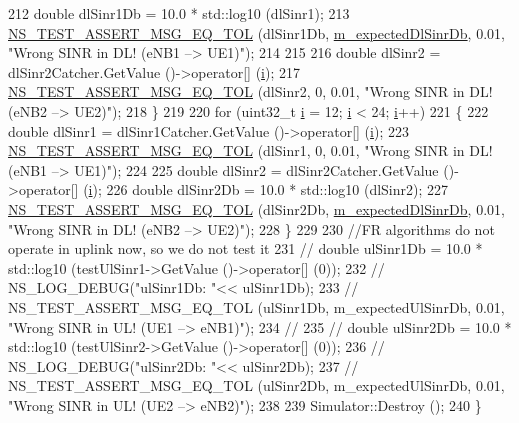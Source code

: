 \begin{DoxyCode}
212       \textcolor{keywordtype}{double} dlSinr1Db = 10.0 * std::log10 (dlSinr1);
213       \hyperlink{group__testing_ga9e7861b56b4e70db3b56044cb7a28e41}{NS\_TEST\_ASSERT\_MSG\_EQ\_TOL} (dlSinr1Db, 
      \hyperlink{classLteInterferenceHardFrTestCase_a4e66afcba8495ddb2ae4696dd905e25d}{m\_expectedDlSinrDb}, 0.01, \textcolor{stringliteral}{"Wrong SINR in DL! (eNB1 --> UE1)"});
214 
215 
216       \textcolor{keywordtype}{double} dlSinr2 = dlSinr2Catcher.GetValue ()->operator[] (\hyperlink{bernuolliDistribution_8m_a6f6ccfcf58b31cb6412107d9d5281426}{i});
217       \hyperlink{group__testing_ga9e7861b56b4e70db3b56044cb7a28e41}{NS\_TEST\_ASSERT\_MSG\_EQ\_TOL} (dlSinr2, 0, 0.01, \textcolor{stringliteral}{"Wrong SINR in DL! (eNB2 -->
       UE2)"});
218     \}
219 
220   \textcolor{keywordflow}{for} (uint32\_t \hyperlink{bernuolliDistribution_8m_a6f6ccfcf58b31cb6412107d9d5281426}{i} = 12; \hyperlink{bernuolliDistribution_8m_a6f6ccfcf58b31cb6412107d9d5281426}{i} < 24; \hyperlink{bernuolliDistribution_8m_a6f6ccfcf58b31cb6412107d9d5281426}{i}++)
221     \{
222       \textcolor{keywordtype}{double} dlSinr1 = dlSinr1Catcher.GetValue ()->operator[] (\hyperlink{bernuolliDistribution_8m_a6f6ccfcf58b31cb6412107d9d5281426}{i});
223       \hyperlink{group__testing_ga9e7861b56b4e70db3b56044cb7a28e41}{NS\_TEST\_ASSERT\_MSG\_EQ\_TOL} (dlSinr1, 0, 0.01, \textcolor{stringliteral}{"Wrong SINR in DL! (eNB1 -->
       UE1)"});
224 
225       \textcolor{keywordtype}{double} dlSinr2 = dlSinr2Catcher.GetValue ()->operator[] (\hyperlink{bernuolliDistribution_8m_a6f6ccfcf58b31cb6412107d9d5281426}{i});
226       \textcolor{keywordtype}{double} dlSinr2Db = 10.0 * std::log10 (dlSinr2);
227       \hyperlink{group__testing_ga9e7861b56b4e70db3b56044cb7a28e41}{NS\_TEST\_ASSERT\_MSG\_EQ\_TOL} (dlSinr2Db, 
      \hyperlink{classLteInterferenceHardFrTestCase_a4e66afcba8495ddb2ae4696dd905e25d}{m\_expectedDlSinrDb}, 0.01, \textcolor{stringliteral}{"Wrong SINR in DL! (eNB2 --> UE2)"});
228     \}
229 
230   \textcolor{comment}{//FR algorithms do not operate in uplink now, so we do not test it}
231 \textcolor{comment}{//  double ulSinr1Db = 10.0 * std::log10 (testUlSinr1->GetValue ()->operator[] (0));}
232 \textcolor{comment}{//  NS\_LOG\_DEBUG("ulSinr1Db: "<< ulSinr1Db);}
233 \textcolor{comment}{//  NS\_TEST\_ASSERT\_MSG\_EQ\_TOL (ulSinr1Db, m\_expectedUlSinrDb, 0.01, "Wrong SINR in UL!  (UE1 --> eNB1)");}
234 \textcolor{comment}{//}
235 \textcolor{comment}{//  double ulSinr2Db = 10.0 * std::log10 (testUlSinr2->GetValue ()->operator[] (0));}
236 \textcolor{comment}{//  NS\_LOG\_DEBUG("ulSinr2Db: "<< ulSinr2Db);}
237 \textcolor{comment}{//  NS\_TEST\_ASSERT\_MSG\_EQ\_TOL (ulSinr2Db, m\_expectedUlSinrDb, 0.01, "Wrong SINR in UL!  (UE2 --> eNB2)");}
238 
239   Simulator::Destroy ();
240 \}
\end{DoxyCode}


